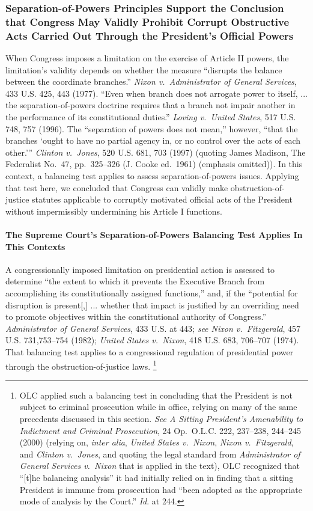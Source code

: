\subsubsection{Separation-of-Powers Principles Support the Conclusion that Congress May Validly Prohibit Corrupt Obstructive Acts Carried Out Through the President’s Official Powers}

When Congress imposes a limitation on the exercise of Article II powers, the limitation’s validity depends on whether the measure “disrupts the balance between the coordinate branches.”
\textit{Nixon v.\ Administrator of General Services}, 433 U.S. 425, 443 (1977).
“Even when branch does not arrogate power to itself, ... the separation-of-powers doctrine requires that a branch not impair another in the performance of its constitutional duties.”
\textit{Loving v.\ United States}, 517 U.S. 748, 757 (1996).
The “separation of powers does not mean,” however, “that the branches ‘ought to have no partial agency in, or no control over the acts of each other.’”
\textit{Clinton v.\ Jones}, 520 U.S. 681, 703 (1997) (quoting James Madison, The Federalist No.~47, pp.~325--326 (J. Cooke ed.~1961) (emphasis omitted)).
In this context, a balancing test applies to assess separation-of-powers issues.
Applying that test here, we concluded that Congress can validly make obstruction-of-justice statutes applicable to corruptly motivated official acts of the President without impermissibly undermining his Article I functions.

\paragraph{The Supreme Court’s Separation-of-Powers Balancing Test Applies In This Contexts}

A congressionally imposed limitation on presidential action is assessed to determine “the extent to which it prevents the Executive Branch from accomplishing its constitutionally assigned functions,” and, if the “potential for disruption is present[,] ... whether that impact is justified by an overriding need to promote objectives within the constitutional authority of Congress.”
\textit{Administrator of General Services}, 433 U.S. at 443;
\textit{see Nixon v.\ Fitzgerald}, 457 U.S. 731,753--754 (1982);
\textit{United States v.\ Nixon}, 418 U.S. 683, 706--707 (1974).
That balancing test applies to a congressional regulation of presidential power through the obstruction-of-justice laws.%
\footnote{OLC applied such a balancing test in concluding that the President is not subject to criminal prosecution while in office, relying on many of the same precedents discussed in this section.
\textit{See A Sitting President’s Amenability to Indictment and Criminal Prosecution}, 24 Op.\ O.L.C. 222, 237--238, 244--245 (2000) (relying on, \textit{inter alia}, \textit{United States v.\ Nixon}, \textit{Nixon v.\ Fitzgerald}, and \textit{Clinton v.\ Jones}, and quoting the legal standard from \textit{Administrator of General Services v.\ Nixon} that is applied in the text), OLC recognized that “[t]he balancing analysis” it had initially relied on in finding that a sitting President is immune from prosecution had “been adopted as the appropriate mode of analysis by the Court.”
\textit{Id}. at 244.}

